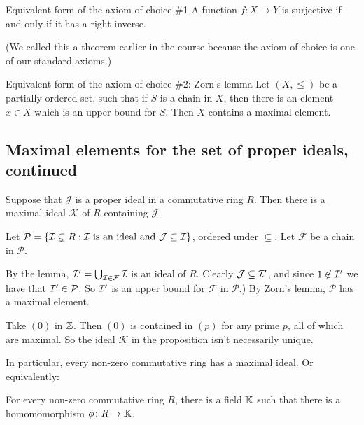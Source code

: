 \documentclass[12pt,letterpaper]{report}
\begin{document}
\begin{axiom}{Equivalent form of the axiom of choice \#1}{}
  A function $f \colon X \to Y$ is surjective if and only if it has a right inverse.
\end{axiom}

(We called this a theorem earlier in the course because the axiom of choice is one of our standard
axioms.)

\begin{axiom}{Equivalent form of the axiom of choice \#2: Zorn's lemma}{}
  Let $(X, \leq)$ be a partially ordered set, such that if $S$ is a chain in $X$, then there is an
  element $x \in X$ which is an upper bound for $S$.
  Then $X$ contains a maximal element.
\end{axiom}

\pagebreak
\subsection{Maximal elements for the set of proper ideals, continued}

\begin{prop}{}{}
  Suppose that $\mathcal{J}$ is a proper ideal in a commutative ring $R$.
  Then there is a maximal ideal $\mathcal{K}$ of $R$ containing $\mathcal{J}$.
\end{prop}

\begin{thmproof}
  Let $\mathcal{P} = \{\mathcal{I} \subsetneq R : \mathcal{I} \text{ is an ideal and }
    \mathcal{J} \subseteq \mathcal{I}\}$, ordered under $\subseteq$.
  Let $\mathcal{F}$ be a chain in $\mathcal{P}$.

  By the lemma, $\mathcal{I}' = \bigcup_{\mathcal{I} \in \mathcal{F}} \mathcal{I}$ is an ideal of $R$.
  Clearly $\mathcal{J} \subseteq \mathcal{I}'$, and since $1 \not\in \mathcal{I}'$ we have that
  $\mathcal{I}' \in \mathcal{P}$.
  So $\mathcal{I}'$ is an upper bound for $\mathcal{F}$ in $\mathcal{P}$.)
  By Zorn's lemma, $\mathcal{P}$ has a maximal element.
\end{thmproof}

\begin{ex}
  Take $(0)$ in $\mathbb{Z}$.
  Then $(0)$ is contained in $(p)$ for any prime $p$, all of which are maximal.
  So the ideal $\mathcal{K}$ in the proposition isn't necessarily unique.
\end{ex}

In particular, every non-zero commutative ring has a maximal ideal.
Or equivalently:

\begin{cor}{}{}
  For every non-zero commutative ring $R$, there is a field $\mathbb{K}$ such that there is a
  homomomorphism $\phi \colon R \to \mathbb{K}$.
\end{cor}
\end{document}
